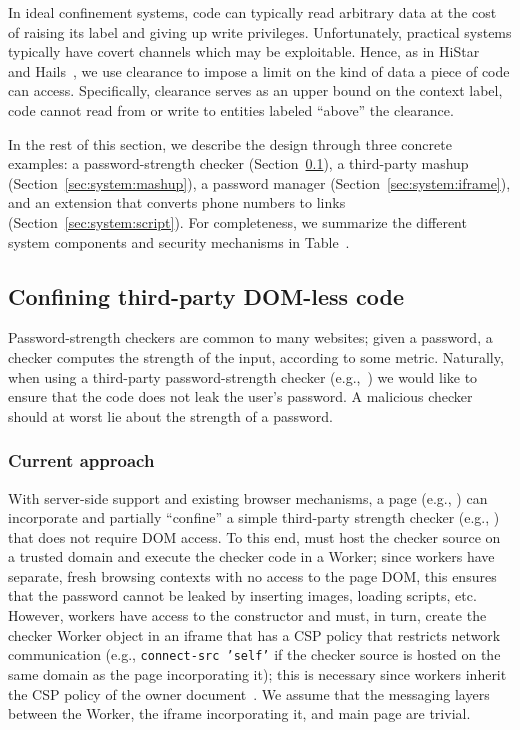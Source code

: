 In ideal confinement systems, code can typically read arbitrary data
at the cost of raising its label and giving up write privileges.
%
Unfortunately, practical systems typically have covert channels which
may be exploitable.
%
Hence, as in HiStar~ and Hails~,
we use clearance to impose a limit on the kind of data a piece of code
can access.
%
Specifically, clearance serves as an upper bound on the context label,
code cannot read from or write to entities labeled ``above'' the
clearance.

In the rest of this section, we describe the \sys{} design through
three concrete examples: a password-strength checker
(Section~\ref{sec:system:worker}), a third-party mashup
(Section~\ref{sec:system:mashup}), a
password manager (Section~\ref{sec:system:iframe}), and an extension
that converts phone numbers to links
(Section~\ref{sec:system:script}).
%
For completeness, we summarize the different system components and
security mechanisms in Table~.



\subsection{Confining third-party DOM-less code}
\label{sec:system:worker}

Password-strength checkers are common to many websites;
%
given a password, a checker computes the strength of the input,
according to some metric.
%
Naturally, when using a third-party password-strength checker
(e.g.,~) we would like to ensure that the
code does not leak the user's password.
%
A malicious checker should at worst lie about the strength of a
password.

\subsubsection{Current approach}
%
With server-side support and existing browser mechanisms, a page
(e.g., ) can incorporate and partially ``confine'' a
simple third-party strength checker (e.g.,
) that does not require DOM access.
%
To this end,  must host the checker source on a
trusted domain and execute the checker code in a Worker; since workers
have separate, fresh browsing contexts with no access to the page DOM,
this ensures that the password cannot be leaked by inserting images,
loading scripts, etc.
%
However, workers have access to the \xhr{} constructor and
 must, in turn, create the checker Worker object in
an iframe that has a CSP policy that restricts network communication
(e.g., \texttt{connect-src 'self'} if the checker source is hosted on
the same domain as the page incorporating it); this is necessary since
workers inherit the CSP policy of the owner document~.
%
We assume that the messaging layers between the Worker, the iframe
incorporating it, and main page are trivial.

